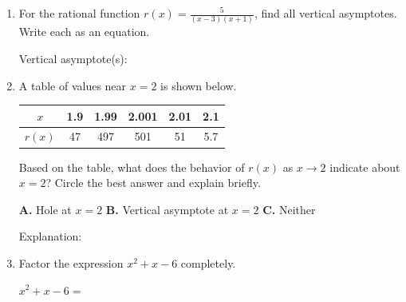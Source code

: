 \documentclass[10pt]{article}
\begin{document}
\namedateperiod

\vspace{0.12in}

\begin{enumerate}[itemsep=14pt]

\item For the rational function $\displaystyle r(x) = \frac{5}{(x-3)(x+1)}$, find all
      vertical asymptotes. Write each as an equation.

      \vspace{0.1in}
      Vertical asymptote(s): \blank{6cm}

\item A table of values near $x = 2$ is shown below.

      \smallskip
      \renewcommand{\arraystretch}{1.3}
      \begin{tabular}{|c|c|c|c|c|c|}
      \hline
      $x$    & 1.9 & 1.99 & 2.001 & 2.01 & 2.1 \\
      \hline
      $r(x)$ & 47  & 497  & 501   & 51   & 5.7 \\
      \hline
      \end{tabular}
      \smallskip

      Based on the table, what does the behavior of $r(x)$ as $x \to 2$ indicate
      about $x = 2$? Circle the best answer and explain briefly.

      \medskip
      \textbf{A.} Hole at $x = 2$ \qquad \textbf{B.} Vertical asymptote at $x = 2$ \qquad \textbf{C.} Neither

      \vspace{0.1in}
      Explanation: \writeline

\item Factor the expression $x^2 + x - 6$ completely.

      \vspace{0.1in}
      $x^2 + x - 6 = $ \blank{5cm}

\end{enumerate}
\end{document}
